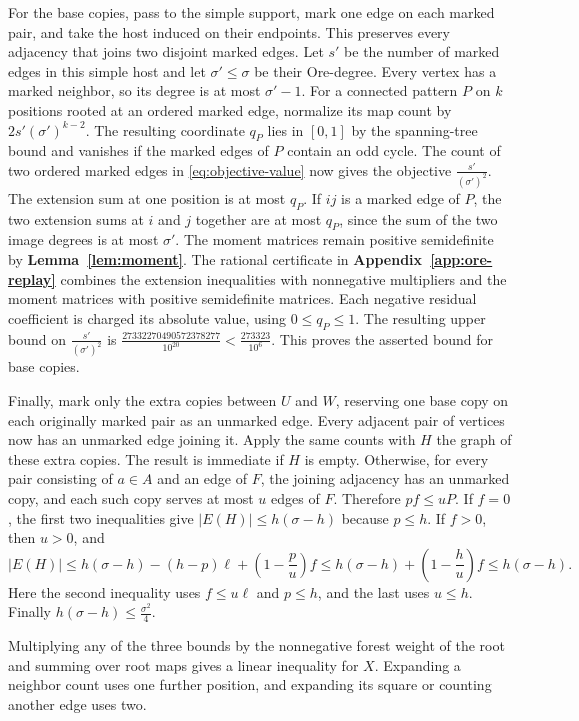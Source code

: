 For the base copies, pass to the simple support, mark one edge on
each marked pair, and take the host induced on their endpoints.
This preserves every adjacency that joins two disjoint marked edges.
Let $s'$ be the number of marked edges in this simple host and let
$\sigma'\leq\sigma$ be their Ore-degree. Every vertex has a marked
neighbor, so its degree is at most $\sigma'-1$. For a connected
pattern $P$ on $k$ positions rooted at an ordered marked edge,
normalize its map count by $2s'(\sigma')^{k-2}$. The resulting
coordinate $q_P$ lies in $[0,1]$ by the spanning-tree bound and
vanishes if the marked edges of $P$ contain an odd cycle.
The count of two ordered marked edges in \eqref{eq:objective-value}
now gives the objective $\frac{s'}{(\sigma')^2}$.
The extension sum at one position is at most $q_P$. If $ij$ is a
marked edge of $P$, the two extension sums at $i$ and $j$ together
are at most $q_P$, since the sum of the two image degrees is at
most $\sigma'$. The moment matrices remain positive semidefinite
by \textbf{Lemma~\ref{lem:moment}}. The rational certificate in
\textbf{Appendix~\ref{app:ore-replay}} combines the extension inequalities
with nonnegative multipliers and the moment matrices with
positive semidefinite matrices. Each negative residual coefficient
is charged its absolute value, using $0\leq q_P\leq1$. The resulting
upper bound on $\frac{s'}{(\sigma')^2}$ is
$\frac{27332270490572378277}{10^{20}}<\frac{273323}{10^6}$.
This proves the asserted bound for base copies.

Finally, mark only the extra copies between $U$ and $W$, reserving
one base copy on each originally marked pair as an unmarked edge.
Every adjacent pair of vertices now has an unmarked edge joining it.
Apply the same counts with $H$ the graph of these extra copies.
The result is immediate if $H$ is empty. Otherwise, for
every pair consisting of $a\in A$ and an edge of $F$, the
joining adjacency has an unmarked copy, and each such copy serves
at most $u$ edges of $F$. Therefore $pf\leq uP$.
If $f=0$, the first two inequalities give $|E(H)|\leq
h(\sigma-h)$ because $p\leq h$. If $f>0$, then $u>0$, and
\[
 |E(H)|\leq h(\sigma-h)-(h-p)\ell+
          \left(1-\frac pu\right)f
 \leq h(\sigma-h)+\left(1-\frac hu\right)f
 \leq h(\sigma-h).
\]
Here the second inequality uses $f\leq u\ell$ and $p\leq h$,
and the last uses $u\leq h$. Finally $h(\sigma-h)\leq
\frac{\sigma^2}{4}$.

Multiplying any of the three bounds by the nonnegative forest
weight of the root and summing over root maps gives a linear
inequality for $X$. Expanding a neighbor count uses one further
position, and expanding its square or counting another edge uses
two.

